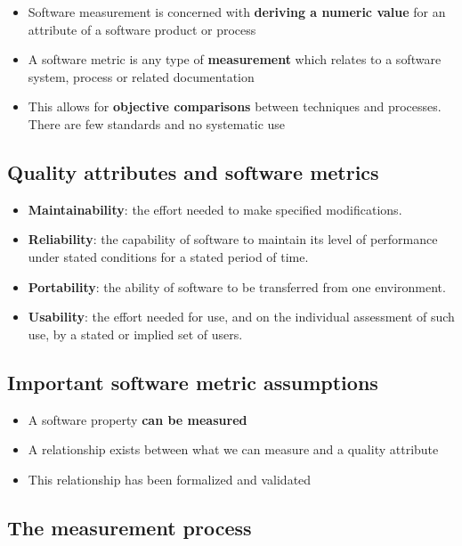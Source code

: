 \documentclass{article}
\begin{document}
\begin{itemize}
  \item Software measurement is concerned with \textbf{deriving a numeric value} for an attribute of a software product or process
  \item A software metric is any type of \textbf{measurement} which relates to a software system, process or related documentation
  \item This allows for \textbf{objective comparisons} between techniques and processes. There are few standards and no systematic use
\end{itemize}

\subsection{Quality attributes and software metrics}
\begin{itemize}
  \item \textbf{Maintainability}: the effort needed to make specified modifications. 
  \item \textbf{Reliability}: the capability of software to maintain its level of performance under stated conditions for a stated period of time. 
  \item \textbf{Portability}:  the ability of software to be transferred from one environment.
  \item \textbf{Usability}: the effort needed for use, and on the individual assessment of such use, by a stated or implied set of users.
\end{itemize}

\subsection{Important software metric assumptions}

\begin{itemize}
  \item A software property \textbf{can be measured}
  \item A relationship exists between what we can measure and a quality attribute
  \item This relationship has been formalized and validated
\end{itemize}

\subsection{The measurement process}
\end{document}
